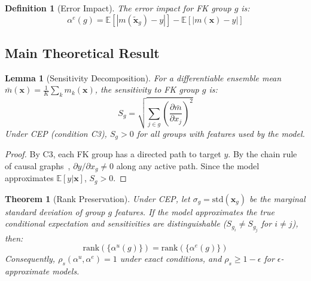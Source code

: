 \documentclass{article}
\newtheorem{theorem}{Theorem}
\newtheorem{definition}{Definition}
\newtheorem{lemma}{Lemma}
\begin{document}
\begin{definition}[Error Impact]
The error impact for FK group $g$ is:
\begin{equation}
\alpha^e(g) = \mathbb{E}[|m(\tilde{\mathbf{x}}_g) - y|] - \mathbb{E}[|m(\mathbf{x}) - y|]
\end{equation}
\end{definition}

\subsection{Main Theoretical Result}

\begin{lemma}[Sensitivity Decomposition]
\label{lem:sensitivity}
For a differentiable ensemble mean $\bar{m}(\mathbf{x}) = \frac{1}{K}\sum_k m_k(\mathbf{x})$,
the sensitivity to FK group $g$ is:
\begin{equation}
S_g = \sqrt{\sum_{j \in g} \left(\frac{\partial \bar{m}}{\partial x_j}\right)^2}
\end{equation}
Under CEP (condition C3), $S_g > 0$ for all groups with features used by the model.
\end{lemma}

\begin{proof}
By C3, each FK group has a directed path to target $y$. By the chain rule of causal
graphs~\citep{pearl2009causality}, $\partial y / \partial x_g \neq 0$ along any active
path. Since the model approximates $\mathbb{E}[y|\mathbf{x}]$, $S_g > 0$.
\end{proof}

\begin{theorem}[Rank Preservation]
\label{thm:main}
Under CEP, let $\sigma_g = \text{std}(\mathbf{x}_g)$ be the marginal standard deviation
of group $g$ features. If the model approximates the true conditional expectation
and sensitivities are distinguishable ($S_{g_i} \neq S_{g_j}$ for $i \neq j$), then:
\begin{equation}
\text{rank}(\{\alpha^u(g)\}) = \text{rank}(\{\alpha^e(g)\})
\end{equation}
Consequently, $\rho_s(\alpha^u, \alpha^e) = 1$ under exact conditions, and
$\rho_s \geq 1 - \epsilon$ for $\epsilon$-approximate models.
\end{theorem}
\end{document}
